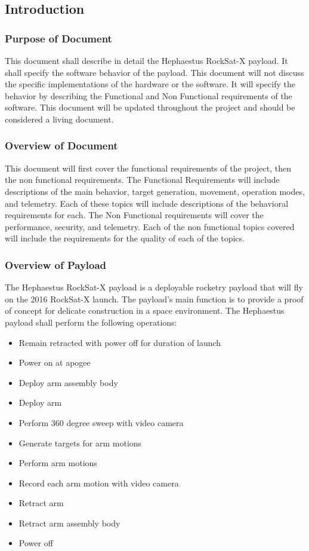 \subsection{Introduction}
\subsubsection{Purpose of Document}
This document shall describe in detail the Hephaestus RockSat-X payload.
It shall specify the software behavior of the payload.
This document will not discuss the specific implementations of the hardware or the software.
It will specify the behavior by describing the Functional and Non Functional requirements of the software.
This document will be updated throughout the project and should be considered a living document.

\subsubsection{Overview of Document}
This document will first cover the functional requirements of the project, then the non functional requirements.
The Functional Requirements will include descriptions of the main behavior, target generation, movement, operation modes, and telemetry.
Each of these topics will include descriptions of the behavioral requirements for each.
The Non Functional requirements will cover the performance, security, and telemetry.
Each of the non functional topics covered will include the requirements for the quality of each of the topics.

\subsubsection{Overview of Payload}
The Hephaestus RockSat-X payload is a deployable rocketry payload that will fly on the 2016 RockSat-X launch.
The payload's main function is to provide a proof of concept for delicate construction in a space environment.
The Hephaestus payload shall perform the following operations:
\begin{itemize}
\item{Remain retracted with power off for duration of launch}
\item{Power on at apogee}
\item{Deploy arm assembly body}
\item{Deploy arm}
\item{Perform 360 degree sweep with video camera}
\item{Generate targets for arm motions}
\item{Perform arm motions}
\item{Record each arm motion with video camera}
\item{Retract arm}
\item{Retract arm assembly body}
\item{Power off}
\end{itemize}

